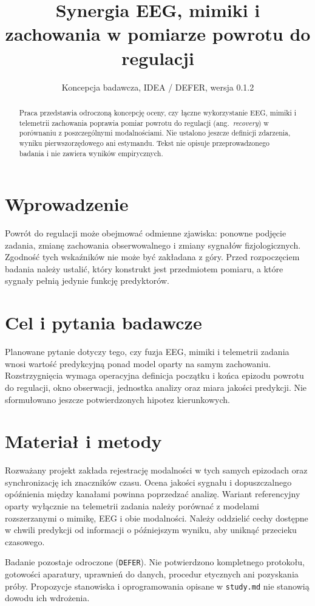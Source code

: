 \documentclass[11pt,a4paper]{article}
\title{Synergia EEG, mimiki i zachowania w pomiarze powrotu do regulacji}
\author{}
\date{Koncepcja badawcza, IDEA / DEFER, wersja 0.1.2}
\begin{document}
\maketitle

\begin{abstract}
Praca przedstawia odroczoną koncepcję oceny, czy łączne wykorzystanie EEG, mimiki i telemetrii zachowania poprawia pomiar powrotu do regulacji (ang.~\emph{recovery}) w porównaniu z poszczególnymi modalnościami. Nie ustalono jeszcze definicji zdarzenia, wyniku pierwszorzędowego ani estymandu. Tekst nie opisuje przeprowadzonego badania i nie zawiera wyników empirycznych.
\end{abstract}

\section{Wprowadzenie}
Powrót do regulacji może obejmować odmienne zjawiska: ponowne podjęcie zadania, zmianę zachowania obserwowalnego i zmiany sygnałów fizjologicznych. Zgodność tych wskaźników nie może być zakładana z góry. Przed rozpoczęciem badania należy ustalić, który konstrukt jest przedmiotem pomiaru, a które sygnały pełnią jedynie funkcję predyktorów.

\section{Cel i pytania badawcze}
Planowane pytanie dotyczy tego, czy fuzja EEG, mimiki i telemetrii zadania wnosi wartość predykcyjną ponad model oparty na samym zachowaniu. Rozstrzygnięcia wymaga operacyjna definicja początku i końca epizodu powrotu do regulacji, okno obserwacji, jednostka analizy oraz miara jakości predykcji. Nie sformułowano jeszcze potwierdzonych hipotez kierunkowych.

\section{Materiał i metody}
Rozważany projekt zakłada rejestrację modalności w tych samych epizodach oraz synchronizację ich znaczników czasu. Ocena jakości sygnału i dopuszczalnego opóźnienia między kanałami powinna poprzedzać analizę. Wariant referencyjny oparty wyłącznie na telemetrii zadania należy porównać z modelami rozszerzanymi o mimikę, EEG i obie modalności. Należy oddzielić cechy dostępne w chwili predykcji od informacji o późniejszym wyniku, aby uniknąć przecieku czasowego.

Badanie pozostaje odroczone (\texttt{DEFER}). Nie potwierdzono kompletnego protokołu, gotowości aparatury, uprawnień do danych, procedur etycznych ani pozyskania próby. Propozycje stanowiska i oprogramowania opisane w \texttt{study.md} nie stanowią dowodu ich wdrożenia.
\end{document}
